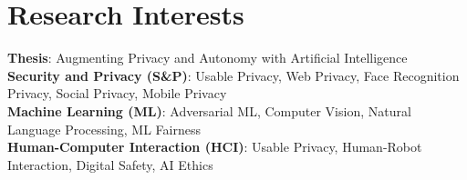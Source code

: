 \section{Research Interests}
 \begin{itemize}[leftmargin=0.5cm, label={}]
    \small{\item{
     \textbf{Thesis}{: Augmenting Privacy and Autonomy with Artificial Intelligence} \\
     \textbf{Security and Privacy (S\&P)}{: Usable Privacy, Web Privacy, Face Recognition Privacy, Social Privacy, Mobile Privacy} \\
     \textbf{Machine Learning (ML)}{: Adversarial ML, Computer Vision, Natural Language Processing, ML Fairness} \\
     \textbf{Human-Computer Interaction (HCI)}{: Usable Privacy, Human-Robot Interaction, Digital Safety, AI Ethics} \\
    }}
 \end{itemize}
